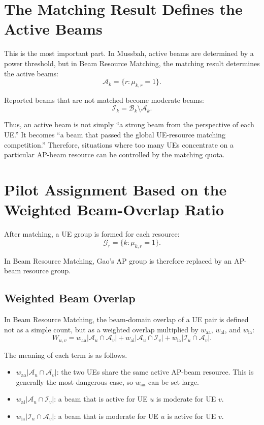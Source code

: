 \documentclass[11pt,a4paper]{article}
\newcommand{\waa}{w_{\mathrm{aa}}}
\newcommand{\wai}{w_{\mathrm{ai}}}
\newcommand{\wia}{w_{\mathrm{ia}}}
\begin{document}
\section{The Matching Result Defines the Active Beams}

This is the most important part. In Mussbah, active beams are determined by a power threshold, but in Beam Resource Matching, the matching result determines the active beams:
\[
    \mathcal{A}_k=\{r:\mu_{k,r}=1\}.
\]

Reported beams that are not matched become moderate beams:
\[
    \mathcal{I}_k=\mathcal{B}_k\setminus\mathcal{A}_k.
\]

Thus, an active beam is not simply ``a strong beam from the perspective of each UE.'' It becomes ``a beam that passed the global UE-resource matching competition.'' Therefore, situations where too many UEs concentrate on a particular AP-beam resource can be controlled by the matching quota.

\section{Pilot Assignment Based on the Weighted Beam-Overlap Ratio}

After matching, a UE group is formed for each resource:
\[
    \mathcal{G}_r=\{k:\mu_{k,r}=1\}.
\]

In Beam Resource Matching, Gao's AP group is therefore replaced by an AP-beam resource group.

\subsection{Weighted Beam Overlap}

In Beam Resource Matching, the beam-domain overlap of a UE pair is defined not as a simple count, but as a weighted overlap multiplied by \(\waa\), \(\wai\), and \(\wia\):
\[
    W_{u,v}
    =
    \waa|\mathcal{A}_u\cap\mathcal{A}_v|
    +
    \wai|\mathcal{A}_u\cap\mathcal{I}_v|
    +
    \wia|\mathcal{I}_u\cap\mathcal{A}_v|.
\]

The meaning of each term is as follows.

\begin{itemize}
    \item \(\waa|\mathcal{A}_u\cap\mathcal{A}_v|\): the two UEs share the same active AP-beam resource. This is generally the most dangerous case, so \(\waa\) can be set large.
    \item \(\wai|\mathcal{A}_u\cap\mathcal{I}_v|\): a beam that is active for UE \(u\) is moderate for UE \(v\).
    \item \(\wia|\mathcal{I}_u\cap\mathcal{A}_v|\): a beam that is moderate for UE \(u\) is active for UE \(v\).
\end{itemize}
\end{document}
